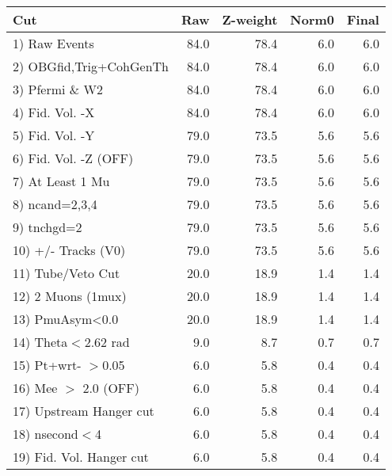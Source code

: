  \begin{table}[h!]\centering
 \begin{tabular}{||l||r|r|r|r||}
 \hline
 \hline
 Cut & Raw & Z-weight & Norm0 & Final \\
 \hline
  1) Raw Events           &        84.0 &        78.4 &         6.0 &         6.0 \\
  2) OBGfid,Trig+CohGenTh &        84.0 &        78.4 &         6.0 &         6.0 \\
  3) Pfermi \& W2         &        84.0 &        78.4 &         6.0 &         6.0 \\
  4) Fid. Vol. -X         &        84.0 &        78.4 &         6.0 &         6.0 \\
  5) Fid. Vol. -Y         &        79.0 &        73.5 &         5.6 &         5.6 \\
  6) Fid. Vol. -Z (OFF)   &        79.0 &        73.5 &         5.6 &         5.6 \\
  7) At Least 1 Mu        &        79.0 &        73.5 &         5.6 &         5.6 \\
  8) ncand=2,3,4          &        79.0 &        73.5 &         5.6 &         5.6 \\
  9) tnchgd=2             &        79.0 &        73.5 &         5.6 &         5.6 \\
 10) +/- Tracks (V0)      &        79.0 &        73.5 &         5.6 &         5.6 \\
 11) Tube/Veto Cut        &        20.0 &        18.9 &         1.4 &         1.4 \\
 12) 2 Muons (1mux)       &        20.0 &        18.9 &         1.4 &         1.4 \\
 13) PmuAsym<0.0          &        20.0 &        18.9 &         1.4 &         1.4 \\
 14) Theta$<$2.62 rad     &         9.0 &         8.7 &         0.7 &         0.7 \\
 15) Pt+wrt- $>$0.05      &         6.0 &         5.8 &         0.4 &         0.4 \\
 16) Mee $>$ 2.0  (OFF)   &         6.0 &         5.8 &         0.4 &         0.4 \\
 17) Upstream Hanger cut  &         6.0 &         5.8 &         0.4 &         0.4 \\
 18) nsecond$<$4          &         6.0 &         5.8 &         0.4 &         0.4 \\
 19) Fid. Vol. Hanger cut &         6.0 &         5.8 &         0.4 &         0.4 \\

\end{tabular}
\end{table}
